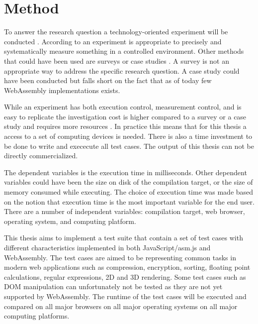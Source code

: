 \section{Method}
\label{method}

To answer the research question a technology-oriented experiment will be conducted \parencite{WohlinRunesonHostOhlssonRegnellWesslen2012}. According to \textcite{WohlinRunesonHostOhlssonRegnellWesslen2012} an experiment is appropriate to precisely and systematically measure something in a controlled environment. Other methods that could have been used are surveys or case studies \parencite{WohlinRunesonHostOhlssonRegnellWesslen2012}. A survey is not an appropriate way to address the specific research question. A case study could have been conducted but falls short on the fact that as of today few WebAssembly implementations exists.

While an experiment has both execution control, measurement control, and is easy to replicate the investigation cost is higher compared to a survey or a case study and requires more resources \parencite{WohlinRunesonHostOhlssonRegnellWesslen2012}. In practice this means that for this thesis a access to a set of computing devices is needed. There is also a time investment to be done to write and exececute all test cases. The output of this thesis can not be directly commercialized.

The dependent variables is the execution time in milliseconds. Other dependent variables could have been the size on disk of the compilation target, or the size of memory consumed while executing. The choice of execution time was made based on the notion that execution time is the most important variable for the end user. There are a number of independent variables: compilation target, web browser, operating system, and computing platform.

This thesis aims to implement a test suite that contain a set of test cases with different characteristics implemented in both JavaScript/asm.js and WebAssembly. The test cases are aimed to be representing common tasks \parencite{WohlinRunesonHostOhlssonRegnellWesslen2012} in modern web applications such as compression, encryption, sorting, floating point calculations, regular expressions, 2D and 3D rendering. Some test cases such as DOM manipulation can unfortunately not be tested as they are not yet supported by WebAssembly. The runtime of the test cases will be executed and compared on all major browsers on all major operating systems on all major computing platforms.

